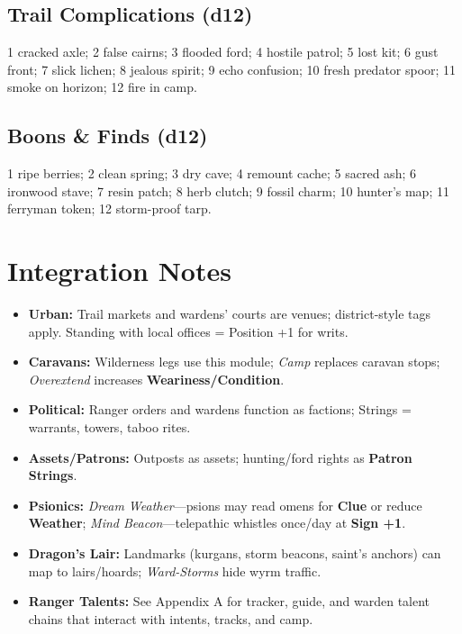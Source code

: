 \documentclass[11pt]{article}
\begin{document}
\subsection{Trail Complications (d12)}
1 cracked axle; 2 false cairns; 3 flooded ford; 4 hostile patrol; 5 lost kit; 6 gust front; 7 slick lichen; 8 jealous spirit; 9 echo confusion; 10 fresh predator spoor; 11 smoke on horizon; 12 fire in camp.

\subsection{Boons \& Finds (d12)}
1 ripe berries; 2 clean spring; 3 dry cave; 4 remount cache; 5 sacred ash; 6 ironwood stave; 7 resin patch; 8 herb clutch; 9 fossil charm; 10 hunter's map; 11 ferryman token; 12 storm-proof tarp.

\section{Integration Notes}
\begin{itemize}
  \item \textbf{Urban:} Trail markets and wardens' courts are venues; district-style tags apply. Standing with local offices = Position +1 for writs.
  \item \textbf{Caravans:} Wilderness legs use this module; \emph{Camp} replaces caravan stops; \emph{Overextend} increases \textbf{Weariness/Condition}.
  \item \textbf{Political:} Ranger orders and wardens function as factions; Strings = warrants, towers, taboo rites.
  \item \textbf{Assets/Patrons:} Outposts as assets; hunting/ford rights as \textbf{Patron Strings}.
  \item \textbf{Psionics:} \emph{Dream Weather}---psions may read omens for \textbf{Clue} or reduce \textbf{Weather}; \emph{Mind Beacon}---telepathic whistles once/day at \textbf{Sign +1}.
  \item \textbf{Dragon's Lair:} Landmarks (kurgans, storm beacons, saint's anchors) can map to lairs/hoards; \emph{Ward-Storms} hide wyrm traffic.
  \item \textbf{Ranger Talents:} See Appendix A for tracker, guide, and warden talent chains that interact with intents, tracks, and camp.
\end{itemize}
\end{document}
